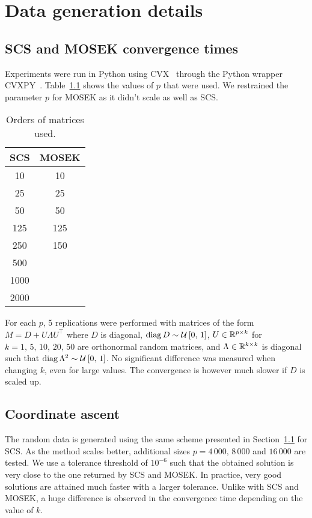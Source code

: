 \chapter{Data generation details}\label{ch:appendix_data}

\section{SCS and MOSEK convergence times}\label{sec:cvx_times}

Experiments were run in Python using CVX~\citep{cvx} through the Python wrapper CVXPY~\citep{cvxpy}.
Table~\ref{tab:cvx_times_ps} shows the values of $p$ that were used.
We restrained the parameter $p$ for MOSEK as it didn't scale as well as SCS\@.
\begin{table}[!htb]
    \centering
    \setlength{\tabcolsep}{2pt}
    {\small
        \begin{tabular}{|c|c|}\hline
        \textbf{SCS} & \textbf{MOSEK}\\ \hline
        10 & 10\\ \hline
        25 & 25\\ \hline
        50 & 50\\ \hline
        125 & 125\\ \hline
        250 & 150\\ \hline
        500 &\\ \hline
        1000 &\\ \hline
        2000 &\\ \hline
        \end{tabular}
    }%
    \caption[short]{
        Orders of matrices used.
    }
    \label{tab:cvx_times_ps}
\end{table}
For each $p$, 5 replications were performed with matrices of the form $M = D + U \Lambda U^\top$ where $D$ is diagonal,
$\operatorname*{diag} D \sim \mathcal{U}\left[ 0,\, 1 \right]$, $U \in \mathbb{R}^{p \times k}$ for $k = 1,\, 5,\, 10,\, 20,\, 50$
are orthonormal random matrices, and $\Lambda \in \mathbb{R}^{k \times k}$ is diagonal such that
$\operatorname*{diag} \Lambda^2 \sim \mathcal{U}\left[ 0,\, 1 \right]$.
No significant difference was measured when changing $k$, even for large values.
The convergence is however much slower if $D$ is scaled up.

\section{Coordinate ascent}\label{sec:coordinate_ascent_data}

The random data is generated using the same scheme presented in Section~\ref{sec:cvx_times} for SCS\@.
As the method scales better, additional sizes $p = 4\,000,\, 8\,000$ and $16\,000$ are tested.
We use a tolerance threshold of $10^{-6}$
such that the obtained solution is very close to the one returned by SCS and MOSEK\@.
In practice, very good solutions are attained much faster with a larger tolerance.
Unlike with SCS and MOSEK, a huge difference is observed in the convergence time depending on the value of $k$.


